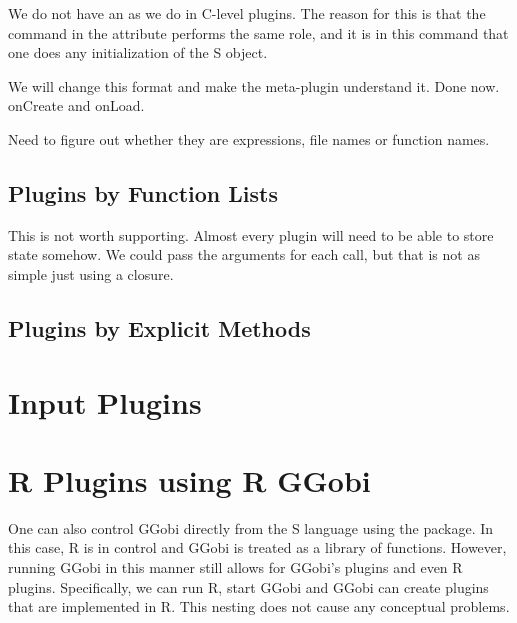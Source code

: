 \documentclass{article}
\begin{document}
We do not have an  as we do in C-level plugins.
The reason for this is that the command in the 
attribute performs the same role, and it is in this command that one
does any initialization of the S object.


We will change this format and make the meta-plugin understand it.
Done now. onCreate and onLoad.

Need to figure out whether they are expressions, file names or
function names.


\subsection{Plugins by Function Lists}
This is not worth supporting.  Almost every plugin will need to be
able to store state somehow.  We could pass the arguments for each
call, but that is not as simple just using a closure.

\subsection{Plugins by Explicit Methods}


\section{Input Plugins}

\section{R Plugins using R GGobi}
One can also control GGobi directly from the S language using the
 package.  In this case, R is in control and GGobi is
treated as a library of functions.  However, running GGobi in this
manner still allows for GGobi's plugins and even R plugins.
Specifically, we can run R, start GGobi and GGobi can create plugins
that are implemented in R.  This nesting does not cause any conceptual
problems.
\end{document}
